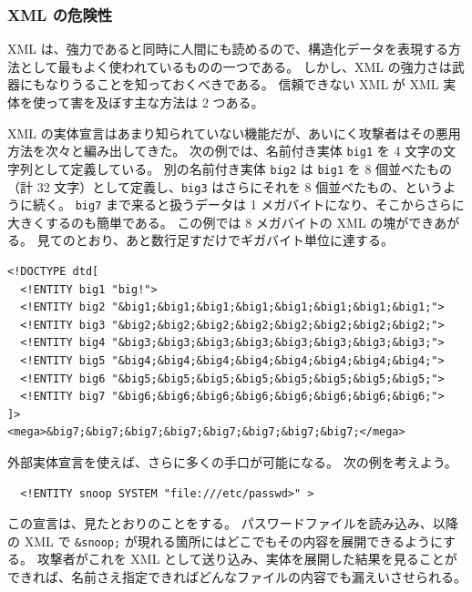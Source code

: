 \documentclass[uplatex]{jsarticle}
\def\label#1{}%
\begin{document}
\subsubsection{XML の危険性}

XML は、強力であると同時に人間にも読めるので、構造化データを表現する方法として最もよく使われているものの一つである。
しかし、XML の強力さは武器にもなりうることを知っておくべきである。
信頼できない XML が XML 実体を使って害を及ぼす主な方法は 2 つある。

\begin{exa}\label{exa:ch10-xml-entity-expansion}
XML の実体宣言はあまり知られていない機能だが、あいにく攻撃者はその悪用方法を次々と編み出してきた。
次の例では、名前付き実体 \texttt{big1} を 4 文字の文字列として定義している。
別の名前付き実体 \texttt{big2} は \texttt{big1} を 8 個並べたもの（計 32 文字）として定義し、\texttt{big3} はさらにそれを 8 個並べたもの、というように続く。
\texttt{big7} まで来ると扱うデータは 1 メガバイトになり、そこからさらに大きくするのも簡単である。
この例では 8 メガバイトの XML の塊ができあがる。
見てのとおり、あと数行足すだけでギガバイト単位に達する。
\begin{verbatim}
<!DOCTYPE dtd[
  <!ENTITY big1 "big!">
  <!ENTITY big2 "&big1;&big1;&big1;&big1;&big1;&big1;&big1;&big1;">
  <!ENTITY big3 "&big2;&big2;&big2;&big2;&big2;&big2;&big2;&big2;">
  <!ENTITY big4 "&big3;&big3;&big3;&big3;&big3;&big3;&big3;&big3;">
  <!ENTITY big5 "&big4;&big4;&big4;&big4;&big4;&big4;&big4;&big4;">
  <!ENTITY big6 "&big5;&big5;&big5;&big5;&big5;&big5;&big5;&big5;">
  <!ENTITY big7 "&big6;&big6;&big6;&big6;&big6;&big6;&big6;&big6;">
]>
<mega>&big7;&big7;&big7;&big7;&big7;&big7;&big7;&big7;</mega>
\end{verbatim}
\end{exa}

\begin{exa}\label{exa:ch10-xxe}
外部実体宣言を使えば、さらに多くの手口が可能になる。
次の例を考えよう。
\begin{verbatim}
  <!ENTITY snoop SYSTEM "file:///etc/passwd>" >
\end{verbatim}
この宣言は、見たとおりのことをする。
パスワードファイルを読み込み、以降の XML で \verb|&snoop;| が現れる箇所にはどこでもその内容を展開できるようにする。
攻撃者がこれを XML として送り込み、実体を展開した結果を見ることができれば、名前さえ指定できればどんなファイルの内容でも漏えいさせられる。
\end{exa}
\end{document}
